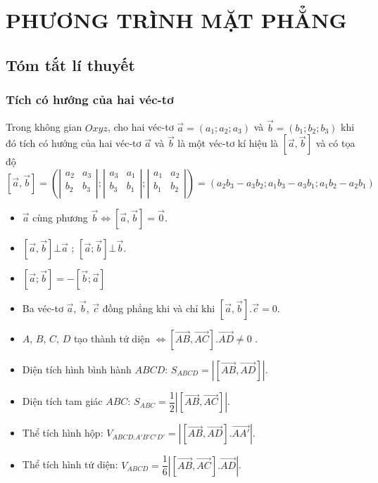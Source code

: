 \section{PHƯƠNG TRÌNH MẶT PHẲNG}
\subsection{Tóm tắt lí thuyết}
\subsubsection{Tích có hướng của hai véc-tơ}
Trong không gian $Oxyz$, cho hai véc-tơ $\vec{a}=(a_1;a_2;a_3)$ và $\vec{b}=(b_1;b_2;b_3)$ khi đó tích có hướng của hai véc-tơ $\vec{a}$ và $\vec{b}$ là một véc-tơ kí hiệu là $\left[\vec{a},\vec{b}\right]$ và có tọa độ 
$$\boxed{\left[\vec{a},\vec{b}\right]=\left(\left| \begin{matrix}
	a_2 & a_3  \\
	b_2 & b_3  \\
	\end{matrix}\right|;\left| \begin{matrix}
	a_3 & a_1  \\
	b_3 & b_1  \\
	\end{matrix}\right|;\left| \begin{matrix}
	a_1 & a_2  \\
	b_1 & b_2  \\
	\end{matrix}\right|\right)=(a_2b_3-a_3b_2;a_1b_3-a_3b_1;a_1b_2-a_2b_1)}$$
\begin{itemize}
	\item $\vec{a}$ cùng phương $\vec{b}\Leftrightarrow \left[\vec{a},\vec{b}\right]=\vec{0}$.
	\item 	$\left[\vec{a},\vec{b}\right]\bot \vec{a}$ ; $\left[\vec{a};\vec{b}\right]\bot \vec{b}$.
	\item 	$\left[\vec{a};\vec{b}\right]=-\left[\vec{b};\vec{a}\right]$ 
	\item Ba véc-tơ $\vec{a}$, $\vec{b}$, $\vec{c}$ đồng phẳng khi và chỉ khi 
	$\left[\vec{a},\vec{b}\right].\vec{c}=0$.
	\item $A$, $B$, $C$, $D$ tạo thành tứ diện $\Leftrightarrow \left[\overrightarrow{AB},\overrightarrow{AC}\right].\overrightarrow{AD}\ne 0$ .
	\item Diện tích hình bình hành $ABCD$: $S_{ABCD}=\left| \left[\overrightarrow{AB},\overrightarrow{AD}\right]\right|$. 
	\item Diện tích tam giác $ABC$: $S_{ABC}=\dfrac{1}{2}\left| \left[\overrightarrow{AB},\overrightarrow{AC}\right]\right|$. 
	\item Thể tích hình hộp: ${V}_{ABCD.{A}'{B}'{C}'{D}'}=\left| \left[\overrightarrow{AB},\overrightarrow{AD}\right].\overrightarrow{A{A}'}\right|$. 
	\item Thể tích hình tứ diện: $V_{ABCD}=\dfrac{1}{6}\left| \left[\overrightarrow{AB},\overrightarrow{AC}\right].\overrightarrow{AD}\right|$. 
\end{itemize}

